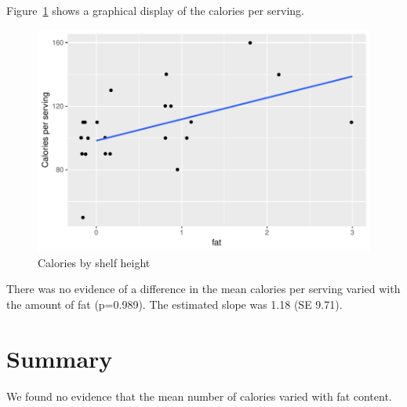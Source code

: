 \documentclass{article}\usepackage[]{graphicx}\usepackage[]{color}
\makeatletter
\def\maxwidth{ %
  \ifdim\Gin@nat@width>\linewidth
    \linewidth
  \else
    \Gin@nat@width
  \fi
}
\newenvironment{knitrout}{}{} %
\makeatother
\begin{document}
Figure~\ref{fig:scatter} shows a graphical display of the calories per serving.



\begin{figure}[h] 
\begin{center} 
\begin{knitrout}
\color{fgcolor}
\includegraphics[width=\maxwidth]{figure/unnamed-chunk-1-1} 

\end{knitrout}
\end{center}
\caption{Calories by shelf height}
\label{fig:scatter}
\end{figure}




There was no evidence  of a difference in the mean calories per serving
varied with the amount of fat (p=0.989).
The estimated slope was 
1.18 (SE
9.71).

\section{Summary}
We found no
evidence that the mean number of calories varied with fat content.
\end{document}
